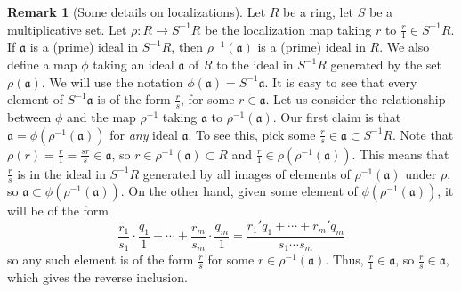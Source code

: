 \documentclass[aps,pra,showpacs,notitlepage,onecolumn,superscriptaddress,nofootinbib]{revtex4-1}
\theoremstyle{definition}
\newtheorem{remark}{Remark}[section]
\begin{document}
\begin{remark}[Some details on localizations]
  \label{rem:s0}
  Let $R$ be a ring, let $S$ be a multiplicative set. Let $\rho : R \rightarrow S^{-1} R$ be the localization map taking $r$ to $\frac{r}{1} \in S^{-1} R$. If $\mathfrak{a}$ is a (prime) ideal in $S^{-1} R$, then
  $\rho^{-1}(\mathfrak{a})$ is a (prime) ideal in $R$. We also define a map $\phi$ taking an ideal $\mathfrak{a}$ of $R$ to the ideal in $S^{-1} R$ generated by the set $\rho(\mathfrak{a})$. We will use the notation
  $\phi(\mathfrak{a}) = S^{-1} \mathfrak{a}$. It is easy to see that every element of $S^{-1} \mathfrak{a}$ is of the form $\frac{r}{s}$, for some $r \in \mathfrak{a}$. Let us consider the relationship
  between $\phi$ and the map $\rho^{-1}$ taking $\mathfrak{a}$ to $\rho^{-1}(\mathfrak{a})$. Our first claim is that $\mathfrak{a} = \phi(\rho^{-1}(\mathfrak{a}))$ for \emph{any} ideal $\mathfrak{a}$. To see this,
  pick some $\frac{r}{s} \in \mathfrak{a} \subset S^{-1} R$. Note that $\rho(r) = \frac{r}{1} = \frac{s r}{s} \in \mathfrak{a}$, so $r \in \rho^{-1}(\mathfrak{a}) \subset R$ and $\frac{r}{1} \in \rho(\rho^{-1}(\mathfrak{a}))$.
  This means that $\frac{r}{s}$ is
  in the ideal in $S^{-1} R$ generated by all images of elements of $\rho^{-1}(\mathfrak{a})$ under $\rho$, so $\mathfrak{a} \subset \phi(\rho^{-1}(\mathfrak{a}))$. On the other hand, given some element of $\phi(\rho^{-1}(\mathfrak{a}))$,
  it will be of the form
  \begin{equation}
    \frac{r_1}{s_1} \cdot \frac{q_1}{1} + \cdots + \frac{r_m}{s_m} \cdot \frac{q_m}{1} = \frac{r_1' q_1 + \cdots + r_m' q_m}{s_1 \cdots s_m}
    \end{equation}
  so any such element is of the form $\frac{r}{s}$ for some $r \in \rho^{-1}(\mathfrak{a})$. Thus, $\frac{r}{1} \in \mathfrak{a}$, so $\frac{r}{s} \in \mathfrak{a}$, which gives the reverse inclusion.


\end{remark}
\end{document}
